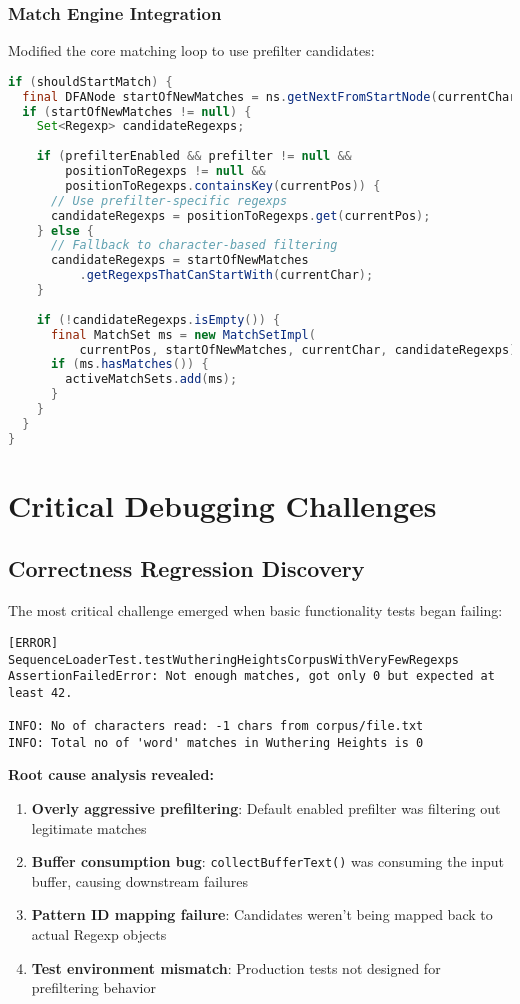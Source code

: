 \documentclass[11pt,a4paper]{article}
\begin{document}
\subsubsection{Match Engine Integration}
Modified the core matching loop to use prefilter candidates:

\begin{lstlisting}[language=Java, caption=Prefilter-driven matching]
if (shouldStartMatch) {
  final DFANode startOfNewMatches = ns.getNextFromStartNode(currentChar);
  if (startOfNewMatches != null) {
    Set<Regexp> candidateRegexps;
    
    if (prefilterEnabled && prefilter != null && 
        positionToRegexps != null && 
        positionToRegexps.containsKey(currentPos)) {
      // Use prefilter-specific regexps
      candidateRegexps = positionToRegexps.get(currentPos);
    } else {
      // Fallback to character-based filtering
      candidateRegexps = startOfNewMatches
          .getRegexpsThatCanStartWith(currentChar);
    }
    
    if (!candidateRegexps.isEmpty()) {
      final MatchSet ms = new MatchSetImpl(
          currentPos, startOfNewMatches, currentChar, candidateRegexps);
      if (ms.hasMatches()) {
        activeMatchSets.add(ms);
      }
    }
  }
}
\end{lstlisting}

\section{Critical Debugging Challenges}

\subsection{Correctness Regression Discovery}

The most critical challenge emerged when basic functionality tests began failing:

\begin{lstlisting}[caption=Test failure symptoms]
[ERROR] SequenceLoaderTest.testWutheringHeightsCorpusWithVeryFewRegexps
AssertionFailedError: Not enough matches, got only 0 but expected at least 42.

INFO: No of characters read: -1 chars from corpus/file.txt
INFO: Total no of 'word' matches in Wuthering Heights is 0
\end{lstlisting}

\textbf{Root cause analysis revealed:}
\begin{enumerate}
\item \textbf{Overly aggressive prefiltering}: Default enabled prefilter was filtering out legitimate matches
\item \textbf{Buffer consumption bug}: \texttt{collectBufferText()} was consuming the input buffer, causing downstream failures
\item \textbf{Pattern ID mapping failure}: Candidates weren't being mapped back to actual Regexp objects
\item \textbf{Test environment mismatch}: Production tests not designed for prefiltering behavior
\end{enumerate}
\end{document}
